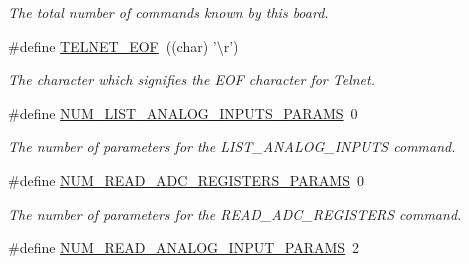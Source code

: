 \begin{DoxyCompactItemize}
\begin{DoxyCompactList}\small\item\em The total number of commands known by this board. \end{DoxyCompactList}\item 
\hypertarget{group__command__interpreter_ga04bb0d5c60e13237cdd0aad90e81bcd5}{\#define \hyperlink{group__command__interpreter_ga04bb0d5c60e13237cdd0aad90e81bcd5}{T\-E\-L\-N\-E\-T\-\_\-\-E\-O\-F}~((char) '\textbackslash{}r')}\label{group__command__interpreter_ga04bb0d5c60e13237cdd0aad90e81bcd5}

\begin{DoxyCompactList}\small\item\em The character which signifies the E\-O\-F character for Telnet. \end{DoxyCompactList}\item 
\hypertarget{group__command__interpreter_ga89c4eb6445082c988990fe2be2f441b5}{\#define \hyperlink{group__command__interpreter_ga89c4eb6445082c988990fe2be2f441b5}{N\-U\-M\-\_\-\-L\-I\-S\-T\-\_\-\-A\-N\-A\-L\-O\-G\-\_\-\-I\-N\-P\-U\-T\-S\-\_\-\-P\-A\-R\-A\-M\-S}~0}\label{group__command__interpreter_ga89c4eb6445082c988990fe2be2f441b5}

\begin{DoxyCompactList}\small\item\em The number of parameters for the L\-I\-S\-T\-\_\-\-A\-N\-A\-L\-O\-G\-\_\-\-I\-N\-P\-U\-T\-S command. \end{DoxyCompactList}\item 
\hypertarget{group__command__interpreter_gae7b1842582f0a314801b97783767e609}{\#define \hyperlink{group__command__interpreter_gae7b1842582f0a314801b97783767e609}{N\-U\-M\-\_\-\-R\-E\-A\-D\-\_\-\-A\-D\-C\-\_\-\-R\-E\-G\-I\-S\-T\-E\-R\-S\-\_\-\-P\-A\-R\-A\-M\-S}~0}\label{group__command__interpreter_gae7b1842582f0a314801b97783767e609}

\begin{DoxyCompactList}\small\item\em The number of parameters for the R\-E\-A\-D\-\_\-\-A\-D\-C\-\_\-\-R\-E\-G\-I\-S\-T\-E\-R\-S command. \end{DoxyCompactList}\item 
\hypertarget{group__command__interpreter_gac419882cd49159e3078f1fedfe7f1d9d}{\#define \hyperlink{group__command__interpreter_gac419882cd49159e3078f1fedfe7f1d9d}{N\-U\-M\-\_\-\-R\-E\-A\-D\-\_\-\-A\-N\-A\-L\-O\-G\-\_\-\-I\-N\-P\-U\-T\-\_\-\-P\-A\-R\-A\-M\-S}~2}\label{group__command__interpreter_gac419882cd49159e3078f1fedfe7f1d9d}


\end{DoxyCompactItemize}
